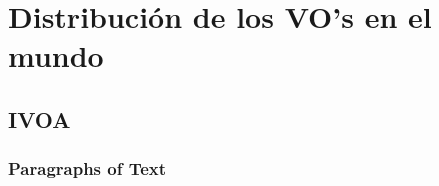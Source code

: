 \section{Distribución de los VO's en el mundo}

\subsection{IVOA}

\begin{frame}
\frametitle{Paragraphs of Text}
\end{frame}
